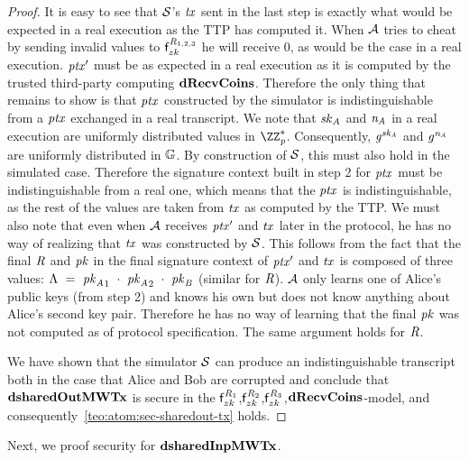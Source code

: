 \begin{proof}
    It is easy to see that $\mathcal{S}$'s $\mathit{tx}$ sent in the last step is exactly what would be expected in a real execution as the TTP has computed it.
    When $\mathcal{A}$ tries to cheat by sending invalid values to $\mathsf{f}^{\mathit{R}_{1,2,3}}_{zk}$ he will receive 0, as would be the case in a real execution.
    ${\mathit{ptx}}'$ must be as expected in a real execution as it is computed by the trusted third-party computing $\mathbf{dRecvCoins}$.
    Therefore the only thing that remains to show is that $\mathit{ptx}$ constructed by the simulator is indistinguishable from a $\mathit{ptx}$ exchanged in a real transcript.
    We note that $\mathit{sk}_{\mathit{A}}$ and $\mathit{\mathit{n}_{\mathit{A}}}$ in a real execution are uniformly distributed values in $\cnstIntegersPrimeWithoutZero{\varPrime}$.
    Consequently, $\mathit{g}^{\mathit{sk}_{\mathit{A}}}$ and $\mathit{g}^{\mathit{\mathit{n}_{\mathit{A}}}}$ are uniformly distributed in $\mathbb{G}$.
    By construction of $\mathcal{S}$, this must also hold in the simulated case.
    Therefore the signature context built in step 2 for $\mathit{ptx}$ must be indistinguishable from a real one, which means that the $\mathit{ptx}$ is indistinguishable, as the rest of the values are taken from $\mathit{tx}$ as computed by the TTP.
    We must also note that even when $\mathcal{A}$ receives ${\mathit{ptx}}'$ and $\mathit{tx}$ later in the protocol, he has no way of realizing that $\mathit{tx}$ was constructed by $\mathcal{S}$.
    This follows from the fact that the final $\mathit{R}$ and $\mathit{pk}$ in the final signature context of ${\mathit{ptx}}'$ and $\mathit{tx}$ is composed of three values:
    $\Lambda ~=~ {\mathit{pk}_{\mathit{A}}}_1 ~\cdot~ {\mathit{pk}_{\mathit{A}}}_2 ~\cdot~ {\mathit{pk}_{\mathit{B}}}$ (similar for $\mathit{R}$).
    $\mathcal{A}$ only learns one of Alice's public keys (from step 2) and knows his own but does not know anything about Alice's second key pair.
    Therefore he has no way of learning that the final $\mathit{pk}$ was not computed as of protocol specification.
    The same argument holds for $\mathit{R}$.

    We have shown that the simulator $\mathcal{S}$ can produce an indistinguishable transcript both in the case that Alice and Bob are corrupted and conclude that $\mathbf{dsharedOutMWTx}$ is secure in the $\mathsf{f}^{\mathit{R}_1}_{zk}$,$\mathsf{f}^{\mathit{R}_2}_{zk}$,$\mathsf{f}^{\mathit{R}_3}_{zk}$,$\mathbf{dRecvCoins}$-model, and consequently~\cref{teo:atom:sec-sharedout-tx} holds.
\end{proof}

Next, we proof security for $\mathbf{dsharedInpMWTx}$.

